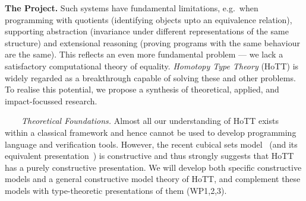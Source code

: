 \documentclass[a4paper,11pt]{article}
\newcommand{\eg}{{e.g.}\ }
\begin{document}
{\bf The Project.} Such systems have fundamental limitations, \eg when
programming with quotients (identifying objects upto an equivalence
relation), supporting abstraction (invariance under different
representations of the same structure) and extensional reasoning
(proving programs with the same behaviour are the same). This reflects
an even more fundamental problem --- we lack a satisfactory
computational theory of equality.  {\em Homotopy Type Theory} (HoTT)
is widely regarded as a breakthrough capable of solving
these and other problems.
To realise this potential, we propose a synthesis of theoretical, applied, and impact-focussed research.






$\;\;\; \;\;\;$ {\em Theoretical Foundations.} Almost all our
understanding of HoTT exists within a classical framework and hence
cannot be used to develop programming language and verification
tools. However, the recent cubical sets model~\cite{BezemM:cubsmt}
(and its equivalent presentation~\cite{nominal}) is constructive and
thus strongly suggests that HoTT has a purely constructive
presentation. We will develop both specific constructive models and a
general constructive model theory of HoTT, and complement these models
with type-theoretic presentations of them (WP1,2,3).
\end{document}

